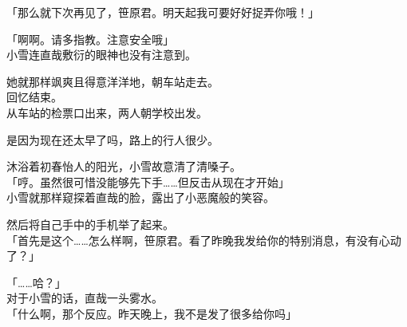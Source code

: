 「那么就下次再见了，笹原君。明天起我可要好好捉弄你哦！」

「啊啊。请多指教。注意安全哦」\\

小雪连直哉敷衍的眼神也没有注意到。

她就那样飒爽且得意洋洋地，朝车站走去。\\

% 


回忆结束。\\

从车站的检票口出来，两人朝学校出发。

是因为现在还太早了吗，路上的行人很少。

沐浴着初春怡人的阳光，小雪故意清了清嗓子。\\

「哼。虽然很可惜没能够先下手……但反击从现在才开始」\\

小雪就那样窥探着直哉的脸，露出了小恶魔般的笑容。

然后将自己手中的手机举了起来。\\

「首先是这个……怎么样啊，笹原君。看了昨晚我发给你的特别消息，有没有心动了？」

「……哈？」\\

对于小雪的话，直哉一头雾水。\\

「什么啊，那个反应。昨天晚上，我不是发了很多给你吗」

